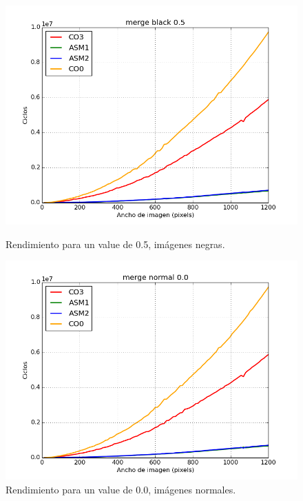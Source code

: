 \documentclass[a4paper]{article}
\begin{document}
\begin{figure}[H]
	\begin{center}
		\includegraphics[scale=0.4]{../tp2-bundle.v2/Testing/plots/all/merge-black-05--all.png}
		\caption{Rendimiento para un value de 0.5, imágenes negras.}
		\label{fig:exp1-5}
	\end{center}
	\endminipage\hfill
	\begin{center}
		\includegraphics[scale=0.4]{../tp2-bundle.v2/Testing/plots/all/merge-normal-00--all.png}
		\caption{Rendimiento para un value de 0.0, imágenes normales.}
		\label{fig:exp1-2}
	\end{center}
	\endminipage\hfill
\end{figure}
\end{document}
